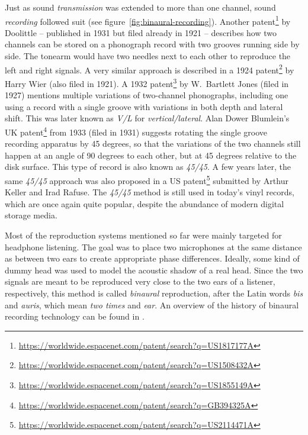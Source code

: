 Just as sound \emph{transmission} was extended to more than one channel,
sound \emph{recording} followed suit
(see figure~\ref{fig:binaural-recording}).
Another
patent\footnote{\url{https://worldwide.espacenet.com/patent/search?q=US1817177A}}
by Doolittle
-- published in 1931 but filed already in 1921 --
describes how two channels can be stored on a phonograph record
with two grooves running side by side.
The tonearm would have two needles next to each other
to reproduce the left and right signals.
A very similar approach is described in a 1924
patent\footnote{\url{https://worldwide.espacenet.com/patent/search?q=US1508432A}}
by
Harry Wier (also filed in 1921).
A 1932
patent\footnote{\url{https://worldwide.espacenet.com/patent/search?q=US1855149A}}
by W.\ Bartlett Jones (filed in 1927)
mentions multiple variations of two-channel phonographs,
including one using a record with
a single groove with variations in both depth and lateral shift.
This was later known as \emph{V/L} for \emph{vertical/lateral}.
Alan Dower Blumlein's UK
patent\footnote{\url{https://worldwide.espacenet.com/patent/search?q=GB394325A}}
from 1933 (filed in 1931)
suggests rotating the single groove recording apparatus by 45 degrees,
so that the variations of the two channels
still happen at an angle of 90 degrees to each other,
but at 45 degrees relative to the disk surface.
This type of record is also known as \emph{45/45}.
A few years later,
the same \emph{45/45} approach was also proposed in a US
patent\footnote{\url{https://worldwide.espacenet.com/patent/search?q=US2114471A}}
submitted by Arthur Keller and Irad Rafuse.
The \emph{45/45} method is still used in today's vinyl records,
which are once again quite popular,
despite the abundance of modern digital storage media.

Most of the reproduction systems mentioned so far were mainly targeted for
headphone listening.
The goal was to
place two microphones at the same distance as between two ears
to create appropriate phase differences.
Ideally, some kind of dummy head was used
to model the acoustic shadow of a real head.
Since the two signals are meant to be reproduced very close to
the two ears of a listener, respectively,
this method is called \emph{binaural} reproduction,
after the Latin words \emph{bis} and \emph{auris},
which mean \emph{two times} and \emph{ear}.
An overview of the history of binaural recording technology can be found in
\parencite{paul2009binaural}.

